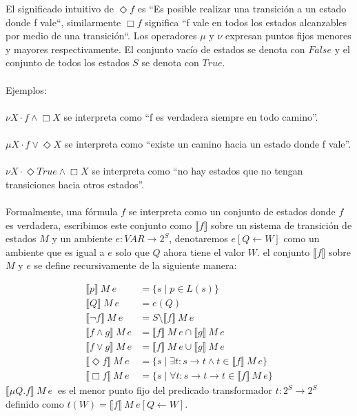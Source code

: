 El significado intuitivo de $\Diamond f$ es “Es posible realizar una transición a un estado donde f vale“, similarmente $\Box f$ significa “f vale en todos los estados alcanzables por medio de una transición“.
Los operadores $\mu$ y $\nu$ expresan puntos fijos menores y mayores respectivamente. El conjunto vacío de estados se denota con $False$ y el conjunto de todos los estados $S$ se denota con $True$.\\
\\
Ejemplos: \\
\\
$\nu X \cdot f \land \Box X$ se interpreta como “f es verdadera siempre en todo camino”.\\
\\
$\mu X \cdot f \lor \Diamond X$ se interpreta como “existe un camino hacia un estado donde f vale”.\\
\\
$\nu X \cdot \Diamond True \land \Box X$ se interpreta como “no hay estados que no tengan transiciones hacia otros estados”.\\
\\
Formalmente, una fórmula $f$ se interpreta como un conjunto de estados donde $f$ es verdadera, escribimos este conjunto como $\llbracket f \rrbracket$ sobre un sistema de transición de estados $M$ y un ambiente $e: VAR \to 2^{S}$, denotaremos $e[Q \gets W]$ como un ambiente que es igual a $e$ solo que $Q$ ahora tiene el valor $W$. el conjunto $\llbracket f \rrbracket$ sobre $M$ y $e$ se define recursivamente de la siguiente manera:

\begin{align*}
\llbracket p \rrbracket \ M\ e &= \{s \mid p \in L(s)\}  \\
 \llbracket Q \rrbracket \ M\ e &= e(Q) \\
 \llbracket \neg f \rrbracket \ M\ e &= S \setminus \llbracket f \rrbracket \ M\ e \\
 \llbracket f \land g \rrbracket \ M\ e &= \llbracket f \rrbracket \ M\ e \cap \llbracket g \rrbracket \ M\ e \\
 \llbracket f \lor g \rrbracket \ M\ e &= \llbracket f \rrbracket \ M\ e \cup \llbracket g \rrbracket \ M\ e \\
 \llbracket \Diamond f \rrbracket \ M\ e &= \{s \mid \exists t : s \to t \land t \in \llbracket f \rrbracket \ M\ e\} \\
 \llbracket \Box f \rrbracket \ M\ e &= \{s \mid \forall t : s \to t  \rightarrow t \in \llbracket f \rrbracket \ M\ e\}
\end{align*}
\noindent $\llbracket \mu Q. f \rrbracket  \ M\ e\ $ es el menor punto fijo del predicado transformador $t:2^{S} \to 2^{S}$ definido como $t(W) = \llbracket f \rrbracket \ M\ e[Q \gets W] $.

